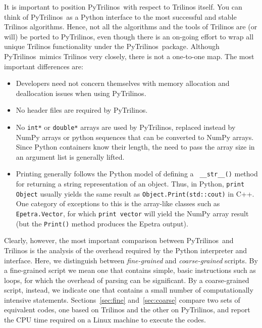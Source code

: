 \documentclass[acmtocl]{acmtrans2m}
\newcommand{\PyTrilinos}{{PyTrilinos}}
\begin{document}
It is important to position \PyTrilinos\ with respect to Trilinos
itself.  You can think of \PyTrilinos\ as a Python interface to the
most successful and stable Trilinos algorithms.  Hence, not all the
algorithms and the tools of Trilinos are (or will) be ported to
\PyTrilinos, even though there is an on-going effort to wrap all
unique Trilinos functionality under the \PyTrilinos\ package.
Although \PyTrilinos\ mimics Trilinos very closely, there is not a
one-to-one map.  The most important differences are:

\begin{itemize}

\item Developers need not concern themselves with memory allocation
  and deallocation issues when using \PyTrilinos.

\item No header files are required by \PyTrilinos.

\item No {\tt int*} or {\tt double*} arrays are used by \PyTrilinos,
  replaced instead by NumPy arrays or python sequences that can be
  converted to NumPy arrays.  Since Python containers know
  their length, the need to pass the array size in an argument list is
  generally lifted.

\item Printing generally follows the Python model of defining a {\tt
  \_\_str\_\_()} method for returning a string representation of an
  object.  Thus, in Python, {\tt print Object} usually yields the same
  result as {\tt Object.Print(std::cout)} in C++.  One category of
  exceptions to this is the array-like classes such as {\tt
    Epetra.Vector}, for which {\tt print vector} will yield the NumPy
  array result (but the {\tt Print()} method produces the Epetra
  output).

\end{itemize}

Clearly, however, the most important comparison between
\PyTrilinos\ and Trilinos is the analysis of the overhead required by
the Python interpreter and interface.  Here, we distinguish between
{\sl fine-grained} and {\sl coarse-grained} scripts.  By a
fine-grained script we mean one that contains simple, basic
instructions such as loops, for which the overhead of parsing can be
significant.  By a coarse-grained script, instead, we indicate one
that contains a small number of computationally intensive statements.
Sections~\ref{sec:fine} and~\ref{sec:coarse} compare two sets of
equivalent codes, one based on Trilinos and the other on \PyTrilinos,
and report the CPU time required on a Linux machine to execute the
codes.
\end{document}
